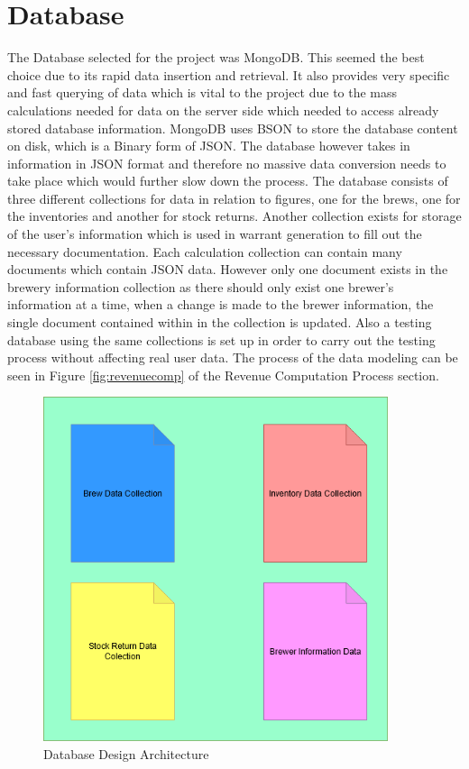 \section{Database}
The Database selected for the project was MongoDB. This seemed the best choice due to its rapid data insertion and retrieval. It also provides very specific and fast querying of data which is vital to the project due to the mass calculations needed for data on the server side which needed to access already stored database information. MongoDB uses BSON to store the database content on disk, which is a Binary form of JSON. The database however takes in information in JSON format and therefore no massive data conversion needs to take place which would further slow down the process. The database consists of three different collections for data in relation to figures, one for the brews, one for the inventories and another for stock returns. Another collection exists for storage of the user’s information which is used in warrant generation to fill out the necessary documentation. Each calculation collection can contain many documents which contain JSON data. However only one document exists in the brewery information collection as there should only exist one brewer's information at a time, when a change is made to the brewer information, the single document contained within in the collection is updated. Also a testing database using the same collections is set up in order to carry out the testing process without affecting real user data. The process of the data modeling can be seen in Figure \ref{fig:revenuecomp} of the Revenue Computation Process section.
\begin{figure}[h!]
 	\caption{Database Design Architecture}
	\label{image:databasedesign}
 	\centering
 	\includegraphics[width=0.9\textwidth]{Images/Database Structure.png}
\end{figure}